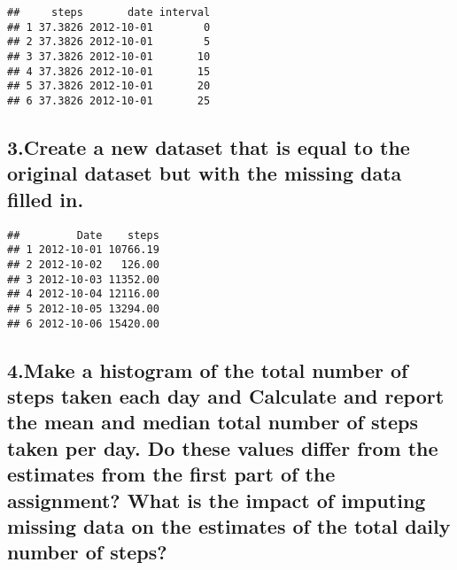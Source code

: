 \documentclass[]{article}
\newenvironment{Shaded}{\begin{snugshade}}{\end{snugshade}}
\newcommand{\KeywordTok}[1]{\textcolor[rgb]{0.13,0.29,0.53}{\textbf{#1}}}
\newcommand{\DataTypeTok}[1]{\textcolor[rgb]{0.13,0.29,0.53}{#1}}
\newcommand{\DecValTok}[1]{\textcolor[rgb]{0.00,0.00,0.81}{#1}}
\newcommand{\StringTok}[1]{\textcolor[rgb]{0.31,0.60,0.02}{#1}}
\newcommand{\OperatorTok}[1]{\textcolor[rgb]{0.81,0.36,0.00}{\textbf{#1}}}
\newcommand{\NormalTok}[1]{#1}
\begin{document}
\begin{Shaded}
\end{Shaded}

\begin{verbatim}
##     steps       date interval
## 1 37.3826 2012-10-01        0
## 2 37.3826 2012-10-01        5
## 3 37.3826 2012-10-01       10
## 4 37.3826 2012-10-01       15
## 5 37.3826 2012-10-01       20
## 6 37.3826 2012-10-01       25
\end{verbatim}

\subsection{3.Create a new dataset that is equal to the original dataset
but with the missing data filled
in.}\label{create-a-new-dataset-that-is-equal-to-the-original-dataset-but-with-the-missing-data-filled-in.}

\begin{Shaded}
\end{Shaded}

\begin{verbatim}
##         Date    steps
## 1 2012-10-01 10766.19
## 2 2012-10-02   126.00
## 3 2012-10-03 11352.00
## 4 2012-10-04 12116.00
## 5 2012-10-05 13294.00
## 6 2012-10-06 15420.00
\end{verbatim}

\subsection{4.Make a histogram of the total number of steps taken each
day and Calculate and report the mean and median total number of steps
taken per day. Do these values differ from the estimates from the first
part of the assignment? What is the impact of imputing missing data on
the estimates of the total daily number of
steps?}\label{make-a-histogram-of-the-total-number-of-steps-taken-each-day-and-calculate-and-report-the-mean-and-median-total-number-of-steps-taken-per-day.-do-these-values-differ-from-the-estimates-from-the-first-part-of-the-assignment-what-is-the-impact-of-imputing-missing-data-on-the-estimates-of-the-total-daily-number-of-steps}
\end{document}
